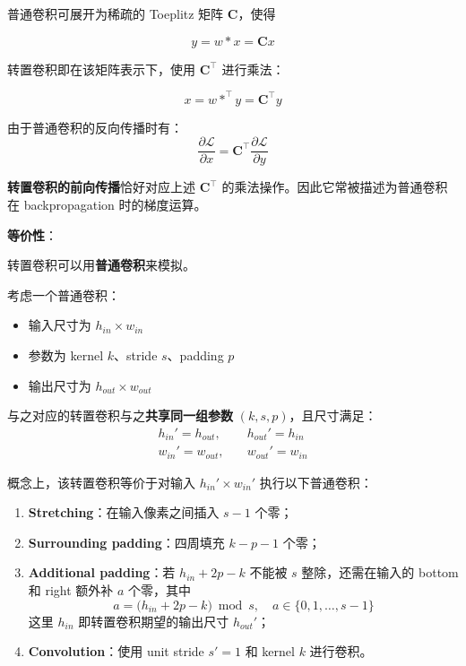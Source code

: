 普通卷积可展开为稀疏的 Toeplitz 矩阵 \(\mathbf{C}\)，使得

\[
y = w * x = \mathbf{C}x
\]

转置卷积即在该矩阵表示下，使用 \(\mathbf{C}^\top\) 进行乘法：

\[
x = w *^\top y = \mathbf{C}^\top y
\]

由于普通卷积的反向传播时有： \[
\frac{\partial \mathcal{L}}{\partial x} = \mathbf{C}^\top \frac{\partial \mathcal{L}}{\partial y}
\]

\textbf{转置卷积的前向传播}恰好对应上述 \(\mathbf{C}^\top\)
的乘法操作。因此它常被描述为普通卷积在 backpropagation 时的梯度运算。

\textbf{等价性}：

转置卷积可以用\textbf{普通卷积}来模拟。

考虑一个普通卷积：

\begin{itemize}
\tightlist
\item
  输入尺寸为 \(h_{in} \times w_{in}\)
\item
  参数为 kernel \(k\)、stride \(s\)、padding \(p\)
\item
  输出尺寸为 \(h_{out} \times w_{out}\)
\end{itemize}

与之对应的转置卷积与之\textbf{共享同一组参数}
\((k, s, p)\)，且尺寸满足： \[
\begin{aligned}
h_{in}' = h_{out},& \quad h_{out}' = h_{in} \\
w_{in}' = w_{out},& \quad w_{out}' = w_{in}
\end{aligned}
\]

概念上，该转置卷积等价于对输入 \(h_{in}' \times w_{in}'\)
执行以下普通卷积：

\begin{enumerate}
\def\labelenumi{\arabic{enumi}.}
\tightlist
\item
  \textbf{Stretching}：在输入像素之间插入 \(s-1\) 个零；
\item
  \textbf{Surrounding padding}：四周填充 \(k - p - 1\) 个零；
\item
  \textbf{Additional padding}：若 \(h_{in} + 2p - k\) 不能被 \(s\)
  整除，还需在输入的 bottom 和 right 额外补 \(a\) 个零，其中 \[
   a = \bigl(h_{in} + 2p - k\bigr) \bmod s, \quad a \in \{0, 1, \dots, s-1\}
   \] 这里 \(h_{in}\) 即转置卷积期望的输出尺寸 \(h_{out}'\)；
\item
  \textbf{Convolution}：使用 unit stride \(s' = 1\) 和 kernel \(k\)
  进行卷积。
\end{enumerate}


